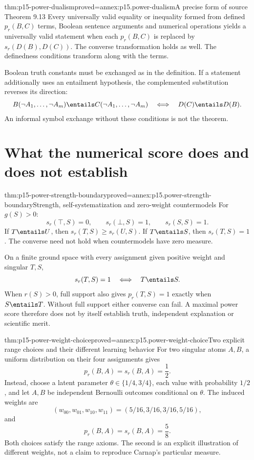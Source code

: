 \begin{hbtheorem}{thm:p15-power-dualism}{proved=annex:p15.power-dualism}{A precise form of source Theorem 9.13}
Every universally valid equality or inequality
formed from defined \(p_r(B,C)\) terms,
Boolean sentence arguments and numerical
operations yields a universally valid
statement when each \(p_r(B,C)\) is
replaced by \(s_r(D(B),D(C))\).
The converse transformation holds as well.
The definedness conditions transform along
with the terms.

Boolean truth constants must be exchanged
as in the definition. If a statement
additionally uses an entailment hypothesis,
the complemented substitution reverses
its direction:
\[
 B(\neg A_1,\ldots,\neg A_m)\entails
 C(\neg A_1,\ldots,\neg A_m)
 \quad\Longleftrightarrow\quad
 D(C)\entails D(B).
\]
An informal symbol exchange without these
conditions is not the theorem.
\end{hbtheorem}

\section{What the numerical score does and does not establish}
\label{sec:p15-power-interpretation}

\begin{hbtheorem}{thm:p15-power-strength-boundary}{proved=annex:p15.power-strength-boundary}{Strength, self-systematization and zero-weight countermodels}
For \(g(S)>0\):
\[
 s_r(\top,S)=0,\qquad s_r(\bot,S)=1,\qquad
 s_r(S,S)=1.
\]
If \(T\entails U\), then
\(s_r(T,S)\ge s_r(U,S)\).
If \(T\entails S\), then \(s_r(T,S)=1\).
The converse need not hold when countermodels
have zero measure.

On a finite ground space with every assignment
given positive weight and singular \(T,S\),
\[
 s_r(T,S)=1\quad\Longleftrightarrow\quad T\entails S.
\]
When \(r(S)>0\), full support also gives
\(p_r(T,S)=1\) exactly when \(S\entails T\).
Without full support either converse can fail.
A maximal power score
therefore does not by itself establish truth,
independent explanation or scientific merit.
\end{hbtheorem}

\begin{hbtheorem}{thm:p15-power-weight-choice}{proved=annex:p15.power-weight-choice}{Two explicit range choices and their different learning behavior}
For two singular atoms \(A,B\), a uniform
distribution on their four assignments gives
\[
                  p_r(B,A)=s_r(B,A)=\frac12.
\]
Instead, choose a latent parameter
\(\theta\in\{1/4,3/4\}\), each value with
probability \(1/2\), and let \(A,B\) be
independent Bernoulli outcomes conditional
on \(\theta\). The induced weights are
\[
 (w_{00},w_{01},w_{10},w_{11})
                         =(5/16,3/16,3/16,5/16),
\]
and
\[
                  p_r(B,A)=s_r(B,A)=\frac58.
\]
Both choices satisfy the range axioms.
The second is an explicit illustration
of different weights, not a claim to
reproduce Carnap's particular measure.
\end{hbtheorem}

